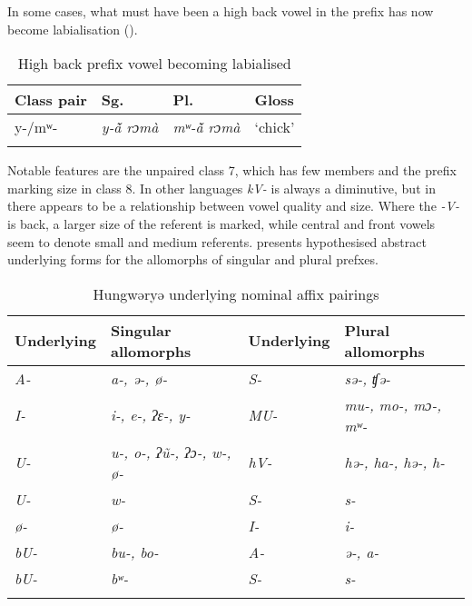 \documentclass[output=paper]{langsci/langscibook}
\begin{document}
In some cases, what must have been a high back vowel in the prefix has now become labialisation ().


\begin{table}[h]
\caption{High back prefix vowel becoming labialised} 
\label{tab:kainji:19einhalb}
\begin{tabularx}{\textwidth}{XXXX}
\lsptoprule
 {Class pair}	& {Sg.}	& {Pl.}	& {Gloss}\\
    \midrule
y-/mʷ-	& \textit{y-ã\v{} rɔmà}	& \textit{mʷ-ã\v{} rɔmà}	& ‘chick’\\
\lspbottomrule
\end{tabularx}
\end{table}


Notable features are the unpaired class 7, which has few members and the prefix marking size in class 8. In other languages \textit{kV-} is always a diminutive, but in  there appears to be a relationship between vowel quality and size. Where the \textit{-V-} is back, a larger size of the referent is marked, while central and front vowels seem to denote small and medium referents.  presents hypothesised abstract underlying forms for the allomorphs of singular and plural prefxes.

\begin{table}
\caption{Hungwəryə underlying nominal affix pairings}
\label{tab:kainji:20}
\begin{tabularx}{\textwidth}{lQlQ}
\lsptoprule
{Underlying}	& {Singular allomorphs}	& {Underlying}	& {Plural allomorphs}\\
    \midrule
\textit{A-}	& \textit{a-, ə-, ø-}	& \textit{S-}	& \textit{sə-, ʧə-}\\
\textit{I-}	& \textit{i-, e-, ʔɛ-, y-}	& \textit{MU-}	& \textit{mu-, mo-, mɔ-, mʷ-}\\
\textit{U-}	& \textit{u-, o-, ʔũ-, ʔɔ-, w-, ø-}	& \textit{hV-}	& \textit{hə-, ha-, hə-, h-}\\
\textit{U-}	& \textit{w-}	& \textit{S-}	& \textit{s-}\\
\textit{ø-}	& \textit{ø-}	& \textit{I-}	& \textit{i-}\\
\textit{bU-}	& \textit{bu-, bo-}	& \textit{A-}	& \textit{ə-, a-}\\
\textit{bU-}	& \textit{bʷ-}	& \textit{S-}	& \textit{s-}\\
\lspbottomrule
\end{tabularx}
\end{table}
\end{document}
